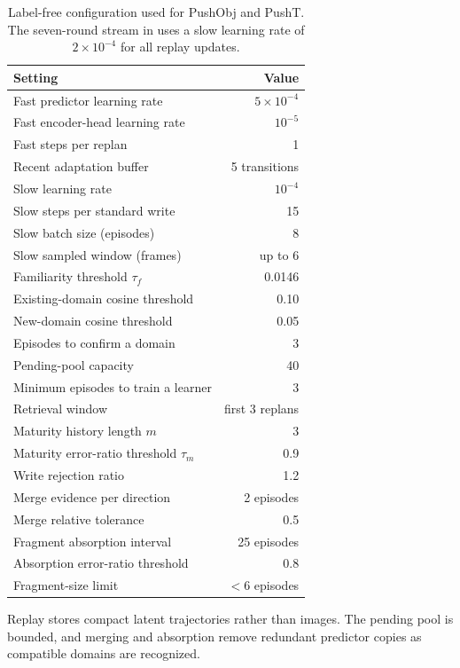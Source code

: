 \begin{table}[t]
  \centering
  \caption{Label-free configuration used for PushObj and PushT. The seven-round stream in  uses a slow learning rate of $2\times10^{-4}$ for all replay updates.}
  \label{tab:hyperparams}
  \small
  \begin{tabular}{lr}
    \toprule
    Setting & Value\\
    \midrule
    Fast predictor learning rate & $5\times10^{-4}$\\
    Fast encoder-head learning rate & $10^{-5}$\\
    Fast steps per replan & 1\\
    Recent adaptation buffer & 5 transitions\\
    Slow learning rate & $10^{-4}$\\
    Slow steps per standard write & 15\\
    Slow batch size (episodes) & 8\\
    Slow sampled window (frames) & up to 6\\
    Familiarity threshold $\tau_f$ & 0.0146\\
    Existing-domain cosine threshold & 0.10\\
    New-domain cosine threshold & 0.05\\
    Episodes to confirm a domain & 3\\
    Pending-pool capacity & 40\\
    Minimum episodes to train a learner & 3\\
    Retrieval window & first 3 replans\\
    Maturity history length $m$ & 3\\
    Maturity error-ratio threshold $\tau_m$ & 0.9\\
    Write rejection ratio & 1.2\\
    Merge evidence per direction & 2 episodes\\
    Merge relative tolerance & 0.5\\
    Fragment absorption interval & 25 episodes\\
    Absorption error-ratio threshold & 0.8\\
    Fragment-size limit & $<6$ episodes\\
    \bottomrule
  \end{tabular}
\end{table}

Replay stores compact latent trajectories rather than images. The pending pool is bounded, and merging and absorption remove redundant predictor copies as compatible domains are recognized.

